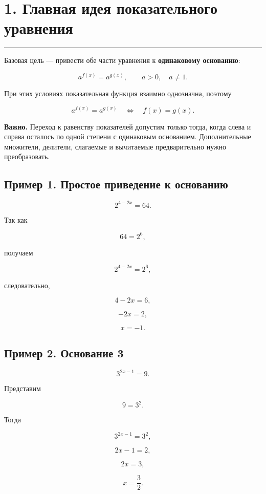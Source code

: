 \documentclass[a4paper,12pt]{article}
\newcommand{\sectionline}{\par\vspace{0.15em}\noindent\textcolor{accent}{\rule{\linewidth}{0.7pt}}\par\vspace{0.2em}}
\newcommand{\key}[1]{\textcolor{darkaccent}{\textbf{#1}}}
\begin{document}

\section*{1. Главная идея показательного уравнения}
\sectionline

Базовая цель --- привести обе части уравнения к
\key{одинаковому основанию}:

\[
a^{f(x)}=a^{g(x)},
\qquad
a>0,
\quad
a\ne1.
\]

При этих условиях показательная функция взаимно однозначна, поэтому

\[
a^{f(x)}=a^{g(x)}
\quad\Longleftrightarrow\quad
f(x)=g(x).
\]

\key{Важно.}
Переход к равенству показателей допустим только тогда, когда слева и справа осталось по одной степени с одинаковым основанием. Дополнительные множители, делители, слагаемые и вычитаемые предварительно нужно преобразовать.

\subsection*{Пример 1. Простое приведение к основанию}

\[
2^{4-2x}=64.
\]

Так как

\[
64=2^6,
\]

получаем

\[
2^{4-2x}=2^6,
\]

следовательно,

\[
4-2x=6,
\]

\[
-2x=2,
\]

\[
\boxed{x=-1}.
\]

\subsection*{Пример 2. Основание 3}

\[
3^{2x-1}=9.
\]

Представим

\[
9=3^2.
\]

Тогда

\[
3^{2x-1}=3^2,
\]

\[
2x-1=2,
\]

\[
2x=3,
\]

\[
\boxed{x=\frac32}.
\]

\end{document}
